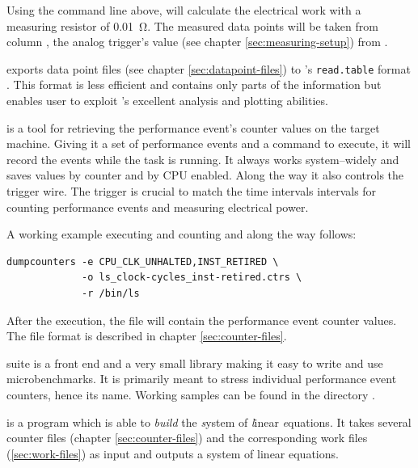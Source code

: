 Using the command line above, \JWTfcw{} will calculate the electrical work with
a measuring resistor of \SI{0.01}{\ohm}. The measured data points will be taken
from column , the analog trigger's value (see chapter
\ref{sec:measuring-setup}) from .


\JWlfour{\JWTde{}}

\JWTde{} exports data point files (see chapter \ref{sec:datapoint-files}) to
\JWTR{}'s \texttt{read.table} format \cite{r11data}. This format is less
efficient and contains only parts of the information but enables user to exploit
\JWTR{}'s excellent analysis and plotting abilities.


\JWlfour{\JWTdc{}}

\JWTdc{} is a tool for retrieving the performance event's counter values on the
target machine. Giving it a set of performance events and a command to execute,
it will record the events while the task is running. It always works
system--widely and saves values by counter and by CPU enabled. Along the way it
also controls the trigger wire. The trigger is crucial to match the time
intervals intervals for counting performance events and measuring electrical
power.

A working example executing  and counting
\JWctrCLK{} and \JWctrINST{} along the way follows:

\begin{lstlisting}[style=Shell]
dumpcounters -e CPU_CLK_UNHALTED,INST_RETIRED \
             -o ls_clock-cycles_inst-retired.ctrs \
             -r /bin/ls
\end{lstlisting}

After the execution, the file  will
contain the performance event counter values. The file format is described in
chapter \ref{sec:counter-files}.



\JWTcbs{} suite is a front end and a very small library making it easy to write
and use microbenchmarks.  It is primarily meant to stress individual performance
event counters, hence its name. Working samples can be found in the directory
\JWpath{ctrbenchmark/benchlets/}.


\JWlfour{\JWTbsle}

\JWTbsle{} is a  program which is able
to \emph{build} the \emph{s}ystem of \emph{l}inear \emph{e}quations. It takes
several counter files (chapter \ref{sec:counter-files}) and the corresponding
work files (\ref{sec:work-files}) as input and outputs a system of linear
equations.

